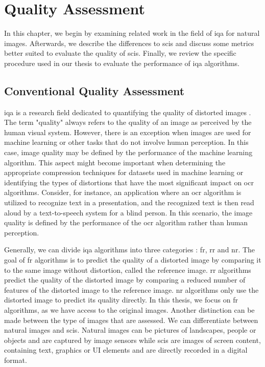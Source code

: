 \chapter{Quality Assessment}
\label{chap:qualityassessment}

In this chapter, we begin by examining related work in the field of \gls{iqa} for natural images.
Afterwards, we describe the differences to \glspl{sci} and discuss some metrics better suited to evaluate the quality of \glspl{sci}.
Finally, we review the specific procedure used in our thesis to evaluate the performance of \gls{iqa} algorithms.

\section{Conventional Quality Assessment}

\Gls{iqa} is a research field dedicated to quantifying the quality of distorted images \cite{iqa_survey_2020}.
The term "quality" always refers to the quality of an image as perceived by the human visual system.
However, there is an exception when images are used for machine learning or other tasks that do not involve human perception.
In this case, image quality may be defined by the performance of the machine learning algorithm.
This aspect might become important when determining the appropriate compression techniques for datasets used in machine learning or identifying the types of distortions that have the most significant impact on \gls{ocr} algorithms.
Consider, for instance, an application where an \gls{ocr} algorithm is utilized to recognize text in a presentation, and the recognized text is then read aloud by a text-to-speech system for a blind person.
In this scenario, the image quality is defined by the performance of the \gls{ocr} algorithm rather than human perception.

Generally, we can divide \gls{iqa} algorithms into three categories \cite{iqa_survey_2020}: \gls{fr}, \gls{rr} and \gls{nr}.
The goal of \gls{fr} algorithms is to predict the quality of a distorted image by comparing it to the same image without distortion, called the reference image.
\Gls{rr} algorithms predict the quality of the distorted image by comparing a reduced number of features of the distorted image to the reference image.
\Gls{nr} algorithms only use the distorted image to predict its quality directly.
In this thesis, we focus on \gls{fr} algorithms, as we have access to the original images.
Another distinction can be made between the type of images that are assessed.
We can differentiate between natural images and \glspl{sci}.
Natural images can be pictures of landscapes, people or objects and are captured by image sensors while \glspl{sci} are images of screen content, containing text, graphics or UI elements and are directly recorded in a digital format.

